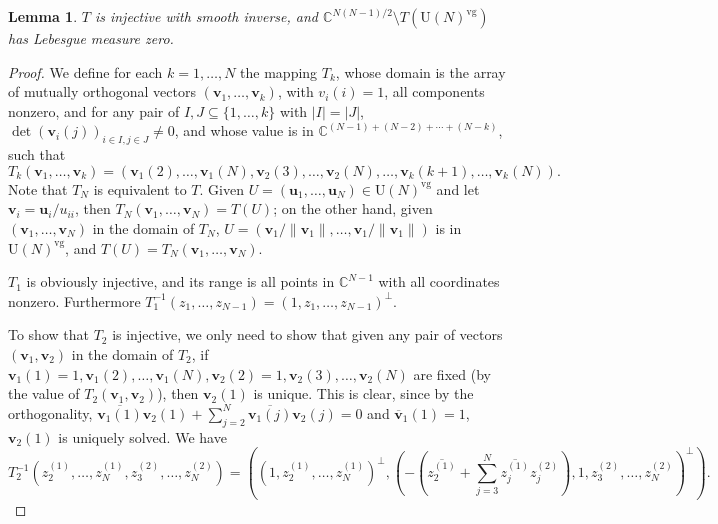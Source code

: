 \documentclass[11pt, a4paper]{article}
\numberwithin{equation}{section}
\newcommand{\compC}{\mathbb{C}}
\newcommand{\Unitary}{\mathrm{U}}
\renewcommand{\vec}[1]{\mathbf{#1}}
\DeclareMathOperator{\verygood}{vg}
\newtheorem{lem}{Lemma}
\theoremstyle{definition}
\theoremstyle{remark}
\begin{document}
\begin{lem} \label{eq:unitary_parametrized}
  $T$ is injective with smooth inverse, and $\compC^{N(N - 1)/2} \setminus T(\Unitary(N)^{\verygood})$ has Lebesgue measure zero.
\end{lem}

\begin{proof}
  We define for each $k = 1, \dotsc, N$ the mapping $T_k$, whose domain is the array of mutually orthogonal vectors $(\vec{v}_1, \dotsc, \vec{v}_k)$, with $v_i(i) = 1$, all components nonzero, and for any pair of $I, J \subseteq \{1, \dotsc, k \}$ with $\lvert I \rvert = \lvert J \rvert$, $\det(\vec{v}_i(j))_{i \in I, j \in J} \neq 0$, and whose value is in $\compC^{(N - 1) + (N - 2) + \dotsb + (N - k)}$, such that
  \begin{equation}
    T_k(\vec{v}_1, \dotsc, \vec{v}_k) = (\vec{v}_1(2), \dotsc, \vec{v}_1(N), \vec{v}_2(3), \dotsc, \vec{v}_2(N), \dotsc, \vec{v}_k(k + 1), \dotsc, \vec{v}_k(N)).
  \end{equation}
  Note that $T_N$ is equivalent to $T$. Given $U = (\vec{u}_1, \dotsc, \vec{u}_N) \in \Unitary(N)^{\verygood}$ and let $\vec{v}_i = \vec{u}_i / u_{ii}$, then $T_N(\vec{v}_1, \dotsc, \vec{v}_N) = T(U)$; on the other hand, given $(\vec{v}_1, \dotsc, \vec{v}_N)$ in the domain of $T_N$, $U = (\vec{v}_1 /   \lVert \vec{v}_1 \rVert, \dotsc, \vec{v}_1 /   \lVert \vec{v}_1 \rVert)$ is in $\Unitary(N)^{\verygood}$, and $T(U) = T_N(\vec{v}_1, \dotsc, \vec{v}_N)$.

  $T_1$ is obviously injective, and its range is all points in $\compC^{N - 1}$ with all coordinates nonzero. Furthermore $T^{-1}_1(z_1, \dotsc, z_{N - 1}) = (1, z_1, \dotsc, z_{N - 1})^{\perp}$.

  To show that $T_2$ is injective, we only need to show that given any pair of vectors $(\vec{v}_1, \vec{v}_2)$ in the domain of $T_2$, if $\vec{v}_1(1) = 1, \vec{v}_1(2), \dotsc, \vec{v}_1(N), \vec{v}_2(2) = 1, \vec{v}_2(3), \dotsc, \vec{v}_2(N)$ are fixed (by the value of $T_2(\vec{v}_1, \vec{v}_2)$), then $\vec{v}_2(1)$ is unique. This is clear, since by the orthogonality, $\overline{\vec{v}_1(1)} \vec{v}_2(1) + \sum^N_{j = 2} \overline{\vec{v}_1(j)} \vec{v}_2(j) = 0$ and $\overline{\vec{v}}_1(1) = 1$, $\vec{v}_2(1)$ is uniquely solved. We have
  \begin{equation} \label{eq:inverse_of_T_2}
    T^{-1}_2(z^{(1)}_2, \dotsc, z^{(1)}_N, z^{(2)}_3, \dotsc, z^{(2)}_N) = ((1, z^{(1)}_2, \dotsc, z^{(1)}_N)^{\perp}, (-(\overline{z^{(1)}_2} + \sum^N_{j = 3} \overline{z^{(1)}_j} z^{(2)}_j), 1, z^{(2)}_3, \dotsc, z^{(2)}_N)^{\perp}).
  \end{equation}


\end{proof}
\end{document}

